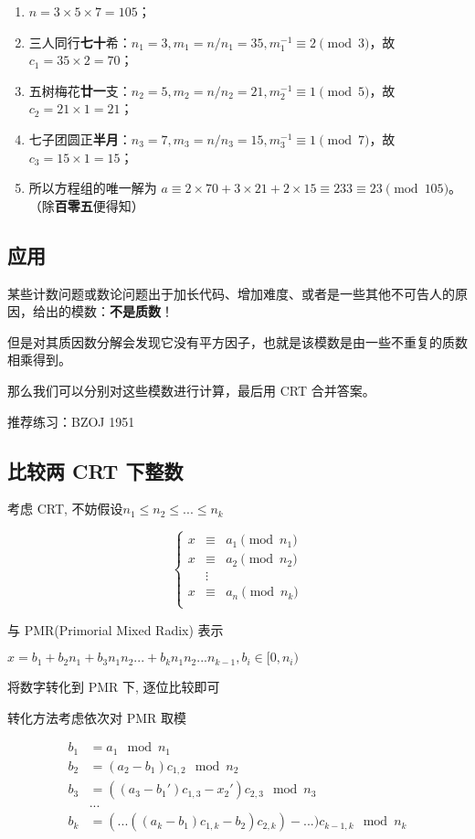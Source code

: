 \begin{enumerate}
\item $n=3\times 5\times 7=105$；
\item 三人同行\textbf{七十}希：$n_1=3, m_1=n/n_1=35, m_1^{-1}\equiv 2\pmod 3$，故 $c_1=35\times 2=70$；
\item 五树梅花\textbf{廿一}支：$n_2=5, m_2=n/n_2=21, m_2^{-1}\equiv 1\pmod 5$，故 $c_2=21\times 1=21$；
\item 七子团圆正\textbf{半月}：$n_3=7, m_3=n/n_3=15, m_3^{-1}\equiv 1\pmod 7$，故 $c_3=15\times 1=15$；
\item 所以方程组的唯一解为 $a\equiv 2\times 70+3\times 21+2\times 15\equiv 233\equiv 23 \pmod {105}$。（除\textbf{百零五}便得知）
\end{enumerate}

\subsection{应用}

某些计数问题或数论问题出于加长代码、增加难度、或者是一些其他不可告人的原因，给出的模数：\textbf{不是质数}！

但是对其质因数分解会发现它没有平方因子，也就是该模数是由一些不重复的质数相乘得到。

那么我们可以分别对这些模数进行计算，最后用 CRT 合并答案。

推荐练习：BZOJ 1951

\subsection{比较两 CRT 下整数}

考虑 CRT, 不妨假设$n_1\leq n_2 \leq ... \leq n_k$

$$
\left \{
\begin{array}{c}
x &\equiv& a_1 \pmod {n_1} \\
x &\equiv& a_2 \pmod {n_2} \\
  &\vdots& \\
x &\equiv& a_n \pmod {n_k} \\
\end{array}
\right.
$$

与 PMR(Primorial Mixed Radix) 表示

$x=b_1+b_2n_1+b_3n_1n_2...+b_kn_1n_2...n_{k-1} ,b_i\in [0,n_i)$

将数字转化到 PMR 下, 逐位比较即可

转化方法考虑依次对 PMR 取模

$$
\begin{align}
b_1&=a_1 \mod n_1\\
b_2&=(a_2-b_1)c_{1,2} \mod n_2\\
b_3&=((a_3-b_1')c_{1,3}-x_2')c_{2,3} \mod n_3\\
&...\\
b_k&=(...((a_k-b_1)c_{1,k}-b_2)c_{2,k})-...)c_{k-1,k} \mod n_k
\end{align}
$$

